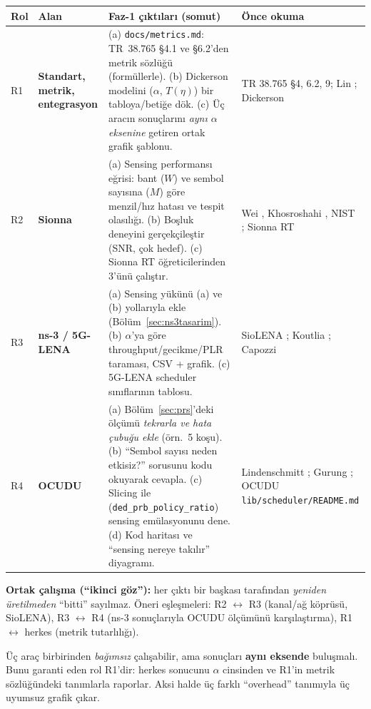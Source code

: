 \begingroup\sffamily\small
\begin{xltabular}{\textwidth}{@{}p{1.1cm}p{2.7cm}Xp{3.4cm}@{}}
\toprule
\textbf{Rol} & \textbf{Alan} & \textbf{Faz-1 çıktıları (somut)} & \textbf{Önce okuma} \\
\midrule
R1 & \textbf{Standart, metrik, entegrasyon} &
  (a) \texttt{docs/metrics.md}: TR~38.765 \S4.1 ve \S6.2'den metrik sözlüğü (formüllerle). (b) Dickerson modelini ($\alpha$, $T(\eta)$) bir tabloya/betiğe dök. (c) Üç aracın sonuçlarını \emph{aynı $\alpha$ eksenine} getiren ortak grafik şablonu. &
  TR 38.765 \S4, 6.2, 9; Lin \cite{lin}; Dickerson \cite{dickerson} \\
R2 & \textbf{Sionna} &
  (a) Sensing performansı eğrisi: bant ($W$) ve sembol sayısına ($M$) göre menzil/hız hatası ve tespit olasılığı. (b) Boşluk deneyini gerçekçileştir (SNR, çok hedef). (c) Sionna RT öğreticilerinden 3'ünü çalıştır. &
  Wei \cite{wei}, Khosroshahi \cite{khos}, NIST \cite{nist}; Sionna RT \cite{sionnart} \\
R3 & \textbf{ns-3 / 5G-LENA} &
  (a) Sensing yükünü (a) ve (b) yollarıyla ekle (Bölüm~\ref{sec:ns3tasarim}). (b) $\alpha$'ya göre throughput/gecikme/PLR taraması, CSV + grafik. (c) 5G-LENA scheduler sınıflarının tablosu. &
  SioLENA \cite{siolena}; Koutlia \cite{koutlia}; Capozzi \cite{capozzi} \\
R4 & \textbf{OCUDU} &
  (a) Bölüm~\ref{sec:prs}'deki ölçümü \emph{tekrarla ve hata çubuğu ekle} (örn.\ 5 koşu). (b) ``Sembol sayısı neden etkisiz?'' sorusunu kodu okuyarak cevapla. (c) Slicing ile (\texttt{ded\_prb\_policy\_ratio}) sensing emülasyonunu dene. (d) Kod haritası ve ``sensing nereye takılır'' diyagramı. &
  Lindenschmitt \cite{linden}; Gurung \cite{gurung}; OCUDU \texttt{lib/scheduler/README.md} \\
\bottomrule
\end{xltabular}
\endgroup

\textbf{Ortak çalışma (``ikinci göz''):} her çıktı bir başkası tarafından \emph{yeniden üretilmeden} ``bitti'' sayılmaz.
Öneri eşleşmeleri: R2 $\leftrightarrow$ R3 (kanal/ağ köprüsü, SioLENA), R3 $\leftrightarrow$ R4 (ns-3 sonuçlarıyla OCUDU ölçümünü karşılaştırma), R1 $\leftrightarrow$ herkes (metrik tutarlılığı).

\begin{dikkat}
Üç araç birbirinden \emph{bağımsız} çalışabilir, ama sonuçları \textbf{aynı eksende} buluşmalı. Bunu garanti eden rol R1'dir: herkes sonucunu $\alpha$ cinsinden ve R1'in metrik sözlüğündeki tanımlarla raporlar.
Aksi halde üç farklı ``overhead'' tanımıyla üç uyumsuz grafik çıkar.
\end{dikkat}

